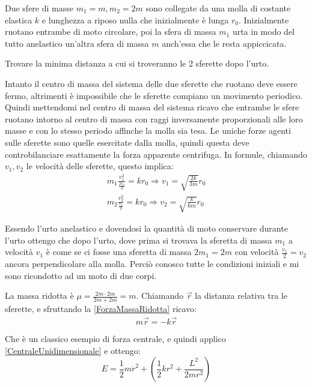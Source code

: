 \documentclass[../main.tex]{subfiles}
\begin{document}
\textex
Due sfere di masse $m_1=m,m_2=2m$ sono collegate da una molla di costante elastica $k$ e lunghezza a riposo nulla che inizialmente è lunga $r_0$. Inizialmente ruotano entrambe di moto circolare, poi la sfera di massa $m_1$ urta in modo del tutto anelastico un'altra sfera di massa $m$ anch'essa che le resta appiccicata.

Trovare la minima distanza a cui si troveranno le 2 sferette dopo l'urto.

\solution
Intanto il centro di massa del sistema delle due sferette che ruotano deve essere fermo, altrimenti è impossibile che le sferette compiano un movimento periodico. Quindi mettendomi nel centro di massa del sistema ricavo che entrambe le sfere ruotano intorno al centro di massa con raggi inversamente proporzionali alle loro masse e con lo stesso periodo affinche la molla sia tesa. Le uniche forze agenti sulle sferette sono quelle esercitate dalla molla, quindi questa deve controbilanciare esattamente la forza apparente centrifuga. In formule, chiamando $v_1,v_2$ le velocità delle sferette, questo implica:
\begin{align}
	m_1\frac{v_1^2}{\frac{2r_0}3}=kr_0\Rightarrow v_1=\sqrt{\frac{2k}{3m}}r_0 \label{mlm:Inizio1}\\
	m_2\frac{v_2^2}{\frac{r_0}3}=kr_0 \Rightarrow v_2=\sqrt{\frac{k}{6m}}r_0 \label{mlm:Inizio2}
\end{align}

Essendo l'urto anelastico e dovendosi la quantità di moto conservare durante l'urto ottengo che dopo l'urto, dove prima si trovava la sferetta di massa $m_1$ a velocità $v_1$ è come se ci fosse una sferetta di massa $2m_1=2m$ con velocità $\frac{v_1}2=v_2$ ancora perpendicolare alla molla. Perciò conosco tutte le condizioni iniziali e mi sono ricondotto ad un moto di due corpi.

La massa ridotta è $\mu=\frac{2m\cdot 2m}{2m+2m}=m$. Chiamando $\vec r$ la distanza relativa tra le sferette, e sfruttando la \cref{ForzaMassaRidotta} ricavo:
\begin{equation*}
	m\ddot{\vec{r}}=-k\vec r
\end{equation*}

Che è un classico esempio di forza centrale, e quindi applico \cref{CentraleUnidimensionale} e ottengo:
\begin{equation}\label{mlm:Energia}
	E=\frac12m\dot r^2+\left(\frac12kr^2+\frac{L^2}{2m r^2}\right)
\end{equation}
\end{document}
